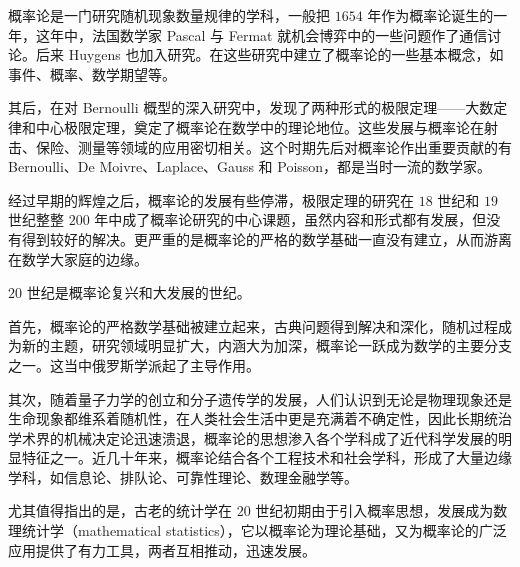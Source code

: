 \documentclass[../../main.tex]{subfiles}
\begin{document}
概率论是一门研究随机现象数量规律的学科，一般把 $1654$ 年作为概率论诞生的一年，这年中，法国数学家 Pascal 与 Fermat 就机会博弈中的一些问题作了通信讨论。后来 Huygens 也加入研究。在这些研究中建立了概率论的一些基本概念，如事件、概率、数学期望等。

其后，在对 Bernoulli 概型的深入研究中，发现了两种形式的极限定理——大数定律和中心极限定理，奠定了概率论在数学中的理论地位。这些发展与概率论在射击、保险、测量等领域的应用密切相关。这个时期先后对概率论作出重要贡献的有 Bernoulli、De Moivre、Laplace、Gauss 和 Poisson，都是当时一流的数学家。

经过早期的辉煌之后，概率论的发展有些停滞，极限定理的研究在 $18$ 世纪和 $19$ 世纪整整 $200$ 年中成了概率论研究的中心课题，虽然内容和形式都有发展，但没有得到较好的解决。更严重的是概率论的严格的数学基础一直没有建立，从而游离在数学大家庭的边缘。

$20$ 世纪是概率论复兴和大发展的世纪。

首先，概率论的严格数学基础被建立起来，古典问题得到解决和深化，随机过程成为新的主题，研究领域明显扩大，内涵大为加深，概率论一跃成为数学的主要分支之一。这当中俄罗斯学派起了主导作用。

其次，随着量子力学的创立和分子遗传学的发展，人们认识到无论是物理现象还是生命现象都维系着随机性，在人类社会生活中更是充满着不确定性，因此长期统治学术界的机械决定论迅速溃退，概率论的思想渗入各个学科成了近代科学发展的明显特征之一。近几十年来，概率论结合各个工程技术和社会学科，形成了大量边缘学科，如信息论、排队论、可靠性理论、数理金融学等。

尤其值得指出的是，古老的统计学在 $20$ 世纪初期由于引入概率思想，发展成为数理统计学（mathematical statistics），它以概率论为理论基础，又为概率论的广泛应用提供了有力工具，两者互相推动，迅速发展。
\end{document}
